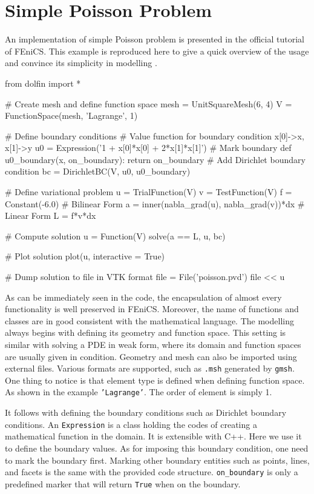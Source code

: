 \section{Simple Poisson Problem}
An implementation of simple Poisson problem is presented in the official tutorial of FEniCS. This example is reproduced here to give a quick overview of the usage and convince its simplicity in modelling \citep{wells2012automated}.

\begin{python}
from dolfin import *

# Create mesh and define function space
mesh = UnitSquareMesh(6, 4)
V = FunctionSpace(mesh, 'Lagrange', 1)

# Define boundary conditions
# Value function for boundary condition x[0]->x, x[1]->y
u0 = Expression('1 + x[0]*x[0] + 2*x[1]*x[1]')
# Mark boundary
def u0_boundary(x, on_boundary):
    return on_boundary
# Add Dirichlet boundary condition
bc = DirichletBC(V, u0, u0_boundary)

# Define variational problem
u = TrialFunction(V)
v = TestFunction(V)
f = Constant(-6.0)
# Bilinear Form
a = inner(nabla_grad(u), nabla_grad(v))*dx
# Linear Form
L = f*v*dx

# Compute solution
u = Function(V)
solve(a == L, u, bc)

# Plot solution
plot(u, interactive = True)

# Dump solution to file in VTK format
file = File('poisson.pvd')
file << u
\end{python}

As can be immediately seen in the code, the encapsulation of almost every functionality is well preserved in FEniCS. Moreover, the name of functions and classes are in good consistent with the mathematical language. The modelling always begins with defining its geometry and function space. This setting is similar with solving a PDE in weak form, where its domain and function spaces are usually given in condition. Geometry and mesh can also be imported using external files. Various formats are supported, such as \texttt{.msh} generated by \texttt{gmsh}. One thing to notice is that element type is defined when defining function space. As shown in the example \texttt{'Lagrange’}. The order of element is simply 1.

It follows with defining the boundary conditions such as Dirichlet boundary conditions. An \texttt{Expression} is a class holding the codes of creating a mathematical function in the domain. It is extensible with C++. Here we use it to define the boundary values. As for imposing this boundary condition, one need to mark the boundary first. Marking other boundary entities such as points, lines, and facets is the same with the provided code structure. \texttt{on\_boundary} is only a predefined marker that will return \texttt{True} when on the boundary.

